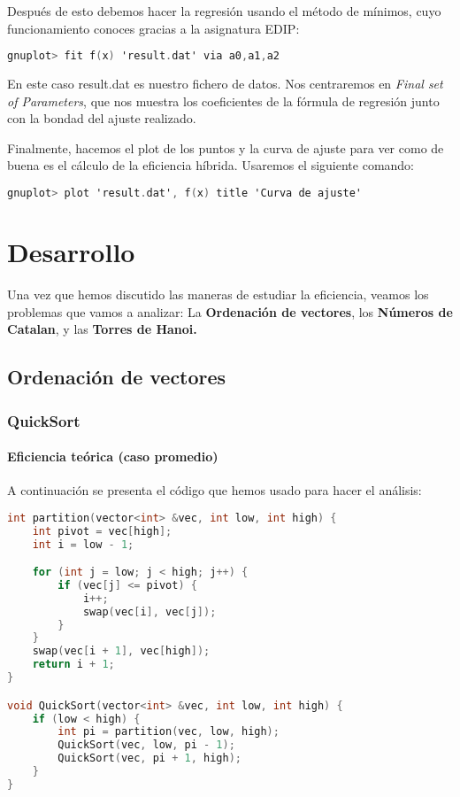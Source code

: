 \documentclass[a4paper,12pt]{article} %
\begin{document}
Después de esto debemos hacer la regresión usando el método de mínimos, cuyo funcionamiento conoces gracias a la asignatura EDIP:

\begin{lstlisting}[language=C, caption={Uso de gnuplot para la regresión}]
        gnuplot> fit f(x) 'result.dat' via a0,a1,a2
         \end{lstlisting}

En este caso result.dat es nuestro fichero de datos.
Nos centraremos en \textit{Final set of Parameters}, que nos muestra los coeficientes de la fórmula de regresión
junto con la bondad del ajuste realizado.

Finalmente, hacemos el plot de los puntos y la curva de ajuste para ver como de buena es el cálculo de la eficiencia híbrida. Usaremos el
siguiente comando:

\begin{lstlisting}[language=C, caption={Representación de la regresión}]
        gnuplot> plot 'result.dat', f(x) title 'Curva de ajuste'
         \end{lstlisting}


\section{Desarrollo}
Una vez que hemos discutido las maneras de estudiar la eficiencia, veamos los problemas
que vamos a analizar: La \textbf{Ordenación de vectores},
los \textbf{Números de Catalan}, y las \textbf{Torres de Hanoi.}

\subsection{Ordenación de vectores}
\subsubsection{QuickSort}
\paragraph{Eficiencia teórica (caso promedio)}

A continuación se presenta el código que hemos usado para hacer el análisis:

\begin{lstlisting}[language=C++, caption={Código de QuickSort}]
int partition(vector<int> &vec, int low, int high) {
	int pivot = vec[high];
	int i = low - 1;

	for (int j = low; j < high; j++) {
		if (vec[j] <= pivot) {
			i++;
			swap(vec[i], vec[j]);
		}
	}
	swap(vec[i + 1], vec[high]);
	return i + 1;
}

void QuickSort(vector<int> &vec, int low, int high) {
	if (low < high) {
		int pi = partition(vec, low, high);
		QuickSort(vec, low, pi - 1);
		QuickSort(vec, pi + 1, high);
	}
}
\end{lstlisting}
\end{document}
